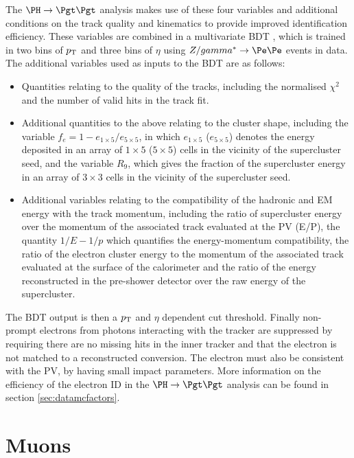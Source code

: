 The $\PH \to \Pgt\Pgt$ analysis makes use of these four variables and additional
conditions on the track quality and kinematics \cite{Baffioni:2006cd} to provide
improved identification efficiency. These variables are combined in a
multivariate \ac{BDT} \cite{TMVA}, which is trained in two bins of
$p_{\mathrm{T}}$ and three bins of $\eta$ using $Z/\gamma^{*} \to \Pe\Pe$ events in data.
The additional variables used as inputs to the \ac{BDT} are as follows:

\begin{itemize}
\item Quantities relating to the quality of the tracks, including the normalised
$\chi^{2}$ and the number of valid hits in the track fit.
\item Additional quantities to the above relating to the cluster shape, including the
variable $f_{e}=1-e_{1\times5}/e_{5\times5}$, in which $e_{1\times5}$
($e_{5\times5}$) denotes the energy deposited in an array of $1 \times 5$ ($5
\times 5$) cells in the vicinity of the supercluster seed, and the variable
$R_{9}$, which gives the fraction of the supercluster energy in an array of
$3\times3$ cells in the vicinity of the supercluster seed.  
\item Additional variables relating to the compatibility of the hadronic and EM
energy with the track momentum, including the ratio of supercluster energy over
the momentum of the associated track evaluated at the \ac{PV} (E/P), the
quantity $1/E-1/p$ which quantifies the energy-momentum compatibility, the ratio
of the electron cluster energy to the momentum of the associated track evaluated
at the surface of the calorimeter and the ratio of the energy reconstructed in
the pre-shower detector over the raw energy of the supercluster.  
\end{itemize}

The \ac{BDT} output is then a $p_{\mathrm{T}}$ and $\eta$ dependent cut threshold. Finally
non-prompt electrons from photons interacting with the tracker are suppressed
by requiring there are no missing hits in the inner tracker and that the
electron is not matched to a reconstructed conversion. The electron must also be
consistent with the \ac{PV}, by having small impact parameters. More information
on the efficiency of the electron ID in the $\PH \to \Pgt\Pgt$ analysis can be
found in section \ref{sec:datamcfactors}.

\section{Muons}
\label{sec:muons}

